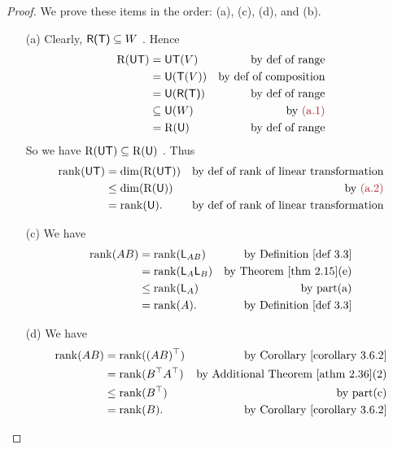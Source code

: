\begin{proof}
We prove these items in the order: (a), (c), (d), and (b).
\begin{enumerate}
\item[(a)] Clearly, \(\textsf{R(T)} \subseteq W\) .
Hence
\begin{align*}
    \RANGE(\U\T) & = \U\T(V) & \text{by def of range} \\
                 & = \U(\T(V)) & \text{by def of composition} \\
                 & = \U(\RANGET) & \text{by def of range} \\
                 & \subseteq \U(W) & \text{by \MAROON{(a.1)}} \\
                 & = \RANGE(\U) & \text{by def of range}
\end{align*}
So we have \(\mathrm{R}(\textsf{U}\textsf{T}) \subseteq \mathrm{R}(\textsf{U})\) .
Thus
\begin{align*}
    \rank(\U\T) & = \dim(\RANGE(\U\T)) & \text{by def of rank of \LTRAN{}} \\
                & \le \dim(\RANGE(\U)) & \text{by \MAROON{(a.2)}} \\
                & = \rank(\U). & \text{by def of rank of \LTRAN{}}
\end{align*}

\item[(c)] We have
\begin{align*}
    \rank(AB) & = \rank(\LMTRAN_{AB}) & \text{by \DEF{3.3}} \\
              & = \rank(\LMTRAN_A \LMTRAN_B) & \text{by \THM{2.15}(e)} \\
              & \le \rank(\LMTRAN_A) & \text{by part(a)} \\
              & = \rank(A). & \text{by \DEF{3.3}}
\end{align*}

\item[(d)] We have
\begin{align*}
    \rank(AB) & = \rank((AB)^\top) & \text{by \CORO{3.6.2}} \\
              & = \rank(B^\top A^\top) & \text{by \ATHM{2.36}(2)} \\
              & \le \rank(B^\top) & \text{by part(c)} \\
              & = \rank(B). & \text{by \CORO{3.6.2}}
\end{align*}


\end{enumerate}
\end{proof}
